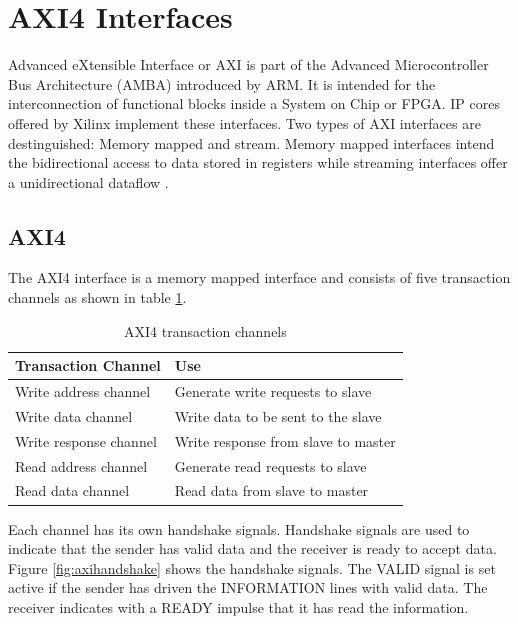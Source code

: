 %
%
\section{AXI4 Interfaces} \label{chapt:theory:axi4interfaces}
Advanced eXtensible Interface or AXI is part of the Advanced Microcontroller Bus
Architecture (AMBA\textregistered) introduced by ARM\textregistered  \cite{axispecs}. 
It is intended for the interconnection of functional blocks inside a System on
Chip or FPGA. IP cores offered by Xilinx implement these interfaces. Two types
of AXI interfaces are destinguished: Memory mapped and stream. Memory mapped
interfaces intend the bidirectional access to data stored in registers while
streaming interfaces offer a unidirectional dataflow \cite{axistreamspecs}.

\subsection{AXI4} \label{chapt:theory:axi4}
The AXI4 interface is a memory mapped interface and consists of five transaction
channels as shown in table
\ref{tab:axi4transchan}. 

\begin{table}[t!]
    \centering
    \begin{tabular}{ l  l}
        \toprule
        Transaction Channel & Use \\
        \midrule
        Write address channel & Generate write requests to slave \\
        Write data channel & Write data to be sent to the slave \\
        Write response channel & Write response from slave to master \\
        Read address channel & Generate read requests to slave \\
        Read data channel & Read data from slave to master \\
        \bottomrule
    \end{tabular}
    \caption{AXI4 transaction channels}
    \label{tab:axi4transchan}
\end{table}

Each channel has its own handshake signals. Handshake signals are used to
indicate that the sender has valid data and the receiver is ready to accept
data. Figure \ref{fig:axihandshake} shows the handshake signals. The VALID
signal is set active if the sender has driven the INFORMATION lines with valid
data. The receiver indicates with a READY impulse that it has read the
information. 

